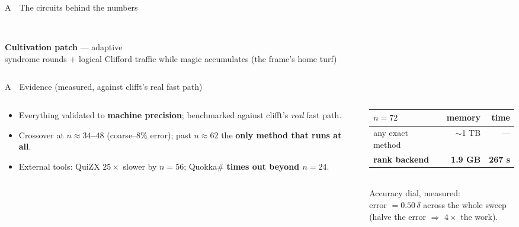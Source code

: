 \documentclass[aspectratio=169,11pt]{beamer}
\newcommand{\punch}[1]{{\color{framerule}\bfseries #1}}
\begin{document}
\begin{frame}{A \,\textperiodcentered\, The circuits behind the numbers}
\begin{columns}[T]
\begin{column}{0.48\textwidth}
\begin{tikzpicture}[xscale=0.56, yscale=0.34,
          g/.style={draw, fill=paper, inner sep=1pt, minimum size=8pt, font=\tiny},
          t/.style={g, fill=copper!28}]
      \end{tikzpicture}\\[1pt]
      {\scriptsize\punch{Cultivation patch} --- adaptive}\\
      {\tiny\color{mutedink} syndrome rounds $+$ logical Clifford traffic while magic accumulates (the frame's home turf)}
    \end{column}
  \end{columns}
\end{frame}

\begin{frame}{A \,\textperiodcentered\, Evidence (measured, against clifft's real fast path)}
  \begin{columns}[T]
    \begin{column}{0.55\textwidth}
      \begin{itemize}
        \item Everything validated to \punch{machine precision}; benchmarked against clifft's \emph{real} fast path.
        \item Crossover at \punch{$n\!\approx\!34$--$48$} (coarse--8\% error); past $n\!\approx\!62$ the \punch{only method that runs at all}.
        \item External tools: QuiZX $25\times$ slower by $n{=}56$; Quokka\# \punch{times out beyond $n{=}24$}.
      \end{itemize}
    \end{column}
    \begin{column}{0.42\textwidth}
      \small
      \begin{tabular}{@{}lrr@{}}
        \toprule
        $n=72$ & memory & time \\
        \midrule
        any exact method & $\sim$1 TB & --- \\
        \textcolor{copper}{\textbf{rank backend}} & \textcolor{copper}{\textbf{1.9 GB}} & \textcolor{copper}{\textbf{267 s}} \\
        \bottomrule
      \end{tabular}\\[1.0em]
      {\scriptsize\color{mutedink} Accuracy dial, measured:\\ error $=0.50\,\delta$ across the whole sweep\\ (halve the error $\Rightarrow$ $4\times$ the work).}
    \end{column}
  \end{columns}
\end{frame}
\end{document}
